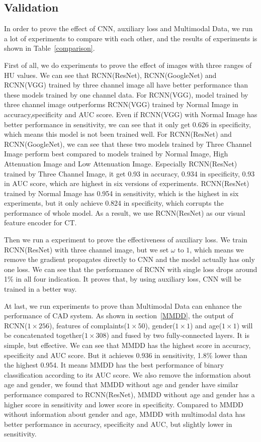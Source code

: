 \documentclass[runningheads]{llncs}
\begin{document}
\subsection{Validation}
\label{exp}
In order to prove the effect of CNN, auxiliary loss and Multimodal Data, we run a lot of experiments to compare with each other, and the results of experiments is shown in Table~\ref{comparison}.

First of all, we do experiments to prove the effect of images with three ranges of HU values. We can see that RCNN(ResNet), RCNN(GoogleNet) and RCNN(VGG) trained by three channel image all have better performance than these models trained by one channel data. 
For RCNN(VGG), model trained by three channel image outperforms RCNN(VGG) trained by Normal Image in accuracy,specificity and AUC score. Even if RCNN(VGG) with Normal Image has better performance in sensitivity, we can see that it only get 0.626 in specificity, which means this model is not been trained well. 
For RCNN(ResNet) and RCNN(GoogleNet), we can see that these two models trained by Three Channel Image perform best compared to models trained by Normal Image, High Attenuation Image and Low Attenuation Image. Especially RCNN(ResNet) trained by Three Channel Image, it get 0.93 in accuracy, 0.934 in specificity, 0.93 in AUC score, which are highest in six versions of experiments. RCNN(ResNet) trained by Normal Image has 0.954 in sensitivity, which is the highest in six experiments, but it only achieve 0.824 in specificity, which corrupts the performance of whole model. As a result, we use RCNN(ResNet) as our visual feature encoder for CT.

Then we run a experiment to prove the effectiveness of auxiliary loss. We train RCNN(ResNet) with three channel image, but we set $\omega$ to $1$, which means we remove the gradient propagates directly to CNN and the model actually has only one loss. We can see that the performance of RCNN with single loss drops around 1\% in all four indication. It proves that, by using auxiliary loss, CNN will be trained in a better way. 

At last, we run experiments to prove than Multimodal Data can enhance the performance of CAD system. As shown in section~\ref{MMDD}, the output of RCNN($1 \times 256$), features of complaints($1 \times 50$), gender($1 \times 1$) and age($1 \times 1$) will be concatenated together($1 \times 308$) and fused by two fully-connected layers. It is simple, but effective. We can see that MMDD has the highest score in accuracy, specificity and AUC score. But it achieves 0.936 in sensitivity, 1.8\% lower than the highest 0.954. It means MMDD has the best performance of binary classification according to its AUC score. We also remove the information about age and gender, we found that MMDD without age and gender have similar performance compared to RCNN(ResNet), MMDD without age and gender has a higher score in sensitivity and lower score in specificity. Compared to MMDD without information about gender and age, MMDD with multimodal data has better performance in accuracy, specificity and AUC, but slightly lower in sensitivity. 
\end{document}
